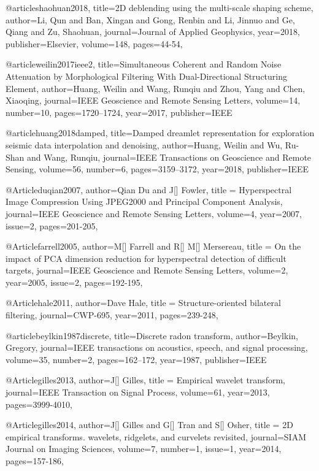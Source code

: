 @article{shaohuan2018,
  title={2{D} deblending using the multi-scale shaping scheme},
  author={Li, Qun and Ban, Xingan and Gong, Renbin and Li, Jinnuo and Ge, Qiang and Zu, Shaohuan},
  journal={Journal of Applied Geophysics},
  year={2018},
  publisher={Elsevier},
 volume={148},
  pages={44-54},
}

@article{weilin2017ieee2,
  title={Simultaneous Coherent and Random Noise Attenuation by Morphological Filtering With Dual-Directional Structuring Element},
  author={Huang, Weilin and Wang, Runqiu and Zhou, Yang and Chen, Xiaoqing},
  journal={IEEE Geoscience and Remote Sensing Letters},
  volume={14},
  number={10},
  pages={1720--1724},
  year={2017},
  publisher={IEEE}
}

@article{huang2018damped,
  title={Damped dreamlet representation for exploration seismic data interpolation and denoising},
  author={Huang, Weilin and Wu, Ru-Shan and Wang, Runqiu},
  journal={IEEE Transactions on Geoscience and Remote Sensing},
  volume={56},
  number={6},
  pages={3159--3172},
  year={2018},
  publisher={IEEE}
}


@Article{duqian2007,
  author={Qian Du and J[] Fowler},
  title = {Hyperspectral Image Compression Using JPEG2000 and Principal Component Analysis},
  journal={IEEE Geoscience and Remote Sensing Letters},
  volume={4},
  year=2007,
  issue=2,
  pages={201-205},
}

@Article{farrell2005,
  author={M[] Farrell and R[] M[] Mersereau},
  title = {On the impact of PCA dimension reduction for hyperspectral detection of difficult targets},
  journal={IEEE Geoscience and Remote Sensing Letters},
  volume={2},
  year=2005,
  issue=2,
  pages={192-195},
}




@Article{hale2011,
  author={Dave Hale},
  title = {Structure-oriented bilateral filtering},
  journal={CWP-695},
  year=2011,
  pages={239-248},
}

@article{beylkin1987discrete,
  title={Discrete radon transform},
  author={Beylkin, Gregory},
  journal={IEEE transactions on acoustics, speech, and signal processing},
  volume={35},
  number={2},
  pages={162--172},
  year={1987},
  publisher={IEEE}
}


@Article{gilles2013,
  author={J[] Gilles},
  title = {Empirical wavelet transform},
  journal={IEEE Transaction on Signal Process},
  volume={61},
  year=2013,
  pages={3999-4010},
}

@Article{gilles2014,
  author={J[] Gilles and G[] Tran and S[] Osher},
  title = {2D empirical transforms. wavelets, ridgelets, and curvelets revisited},
  journal={SIAM Journal on Imaging Sciences},
  volume={7},
  number=1,
  issue=1,
  year=2014,
  pages={157-186},
}




